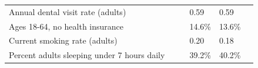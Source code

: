 \documentclass[9pt]{report}
\begin{document}
\begin{tabular}{p{.10in}p{.10in}p{.10in}p{3.7in}>{\hfill}p{.85in}>{\hfill}p{.85in}>{\hfill}p{.85in}>{\hfill}p{.85in}p{0.1in}}
\multicolumn{4}{l}{\parbox{3.6in}{\strut\raggedright{{Annual dental visit rate (adults)}}\strut}} &  &  & 0.59 & 0.59 & \multicolumn{1}{l}{}  \\ 
\multicolumn{4}{l}{\parbox{3.6in}{\strut\raggedright{{Ages 18-64, no health insurance}}\strut}} &  &  & 14.6\% & 13.6\% & \multicolumn{1}{l}{}  \\ 
\multicolumn{4}{l}{\parbox{3.6in}{\strut\raggedright{{Current smoking rate (adults)}}\strut}} &  &  & 0.20 & 0.18 & \multicolumn{1}{l}{}  \\ 
\multicolumn{4}{l}{\parbox{3.6in}{\strut\raggedright{{Percent adults sleeping under 7 hours daily}}\strut}} &  &  & 39.2\% & 40.2\% & \multicolumn{1}{l}{}  \\ 

\end{tabular}
\setlength{\tabcolsep}{6pt} %


\vspace{36pt}
\linespread{1.5}
\theendnotes
\end{document}
